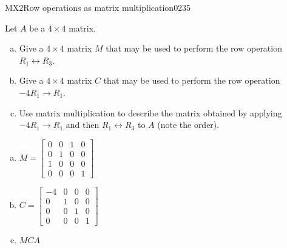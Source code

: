 \begin{exercise}{MX2}{Row operations as matrix multiplication}{0235} 
\begin{exerciseStatement} 

Let \(A\) be a \(4 \times 4\) matrix.

 

\begin{enumerate}[(a)]
\item Give a \(4 \times 4\) matrix \(M\) that may be used to perform the row operation \(R_1 \leftrightarrow R_3\).
\item Give a \(4 \times 4\) matrix \(C\) that may be used to perform the row operation \(-4 R_1 \to R_1\).
\item Use matrix multiplication to describe the matrix obtained by applying \(-4 R_1 \to R_1\) and then \(R_1 \leftrightarrow R_3\) to \(A\) (note the order). 
\end{enumerate}

     \end{exerciseStatement}
 \begin{exerciseAnswer} 

\begin{enumerate}[(a)]
\item \(M=\left[\begin{array}{cccc}
0 & 0 & 1 & 0 \\
0 & 1 & 0 & 0 \\
1 & 0 & 0 & 0 \\
0 & 0 & 0 & 1
\end{array}\right]\)
\item \(C=\left[\begin{array}{cccc}
-4 & 0 & 0 & 0 \\
0 & 1 & 0 & 0 \\
0 & 0 & 1 & 0 \\
0 & 0 & 0 & 1
\end{array}\right]\)
\item  \(MCA\) 
\end{enumerate}

     \end{exerciseAnswer}
 \end{exercise}



